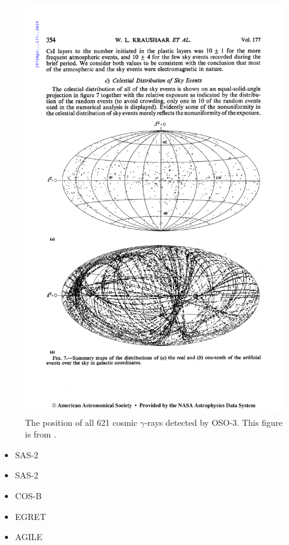 \begin{figure}[htb]
\includegraphics{chapters/introduction/figures/kraushaar_et_al_1972_skymap.pdf}
\caption{The position of all 621 cosmic $\gamma$-rays
detected by \ac{OSO-3}. This figure is from 
\cite{kraushaar_1972_high-energy-cosmic}. }
\end{figure}




\begin{itemize}
\item 


  \ac{SAS-2}
  

  \item SAS-2
  \item COS-B
  \item EGRET

  \item AGILE
\end{itemize}

